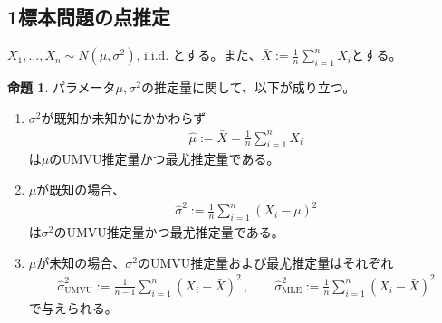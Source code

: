 \documentclass[11pt]{ltjsarticle}
\theoremstyle{definition}
\newtheorem{proposition}[theorem]{命題}
\begin{document}
\subsection{1標本問題の点推定}
$X_1,\ldots,X_n \sim N(\mu, \sigma^2)$, i.i.d. とする。また、$\bar{X} := \frac{1}{n}\sum_{i=1}^n X_i$とする。
\begin{proposition}
    パラメータ$\mu,\sigma^2$の推定量に関して、以下が成り立つ。
    \begin{enumerate}[(1)]
        \item $\sigma^2$が既知か未知かにかかわらず
        \begin{align}
            \hat{\mu} := \bar{X} = \frac{1}{n}\sum_{i=1}^n X_i
        \end{align}
        は$\mu$のUMVU推定量かつ最尤推定量である。
        \item $\mu$が既知の場合、
        \begin{align}
            \hat{\sigma}^2 :=\frac{1}{n}\sum_{i=1}^n(X_i - \mu)^2
        \end{align}
        は$\sigma^2$のUMVU推定量かつ最尤推定量である。
        \item $\mu$が未知の場合、$\sigma^2$のUMVU推定量および最尤推定量はそれぞれ
        \begin{align}
            \hat{\sigma}_{\text{UMVU}}^2 :=\frac{1}{n-1}\sum_{i=1}^n(X_i-\bar{X})^2\, , \qquad \hat{\sigma}_{\text{MLE}}^2 :=\frac{1}{n}\sum_{i=1}^n(X_i-\bar{X})^2
        \end{align}
        で与えられる。
    \end{enumerate}
\end{proposition}
\end{document}
